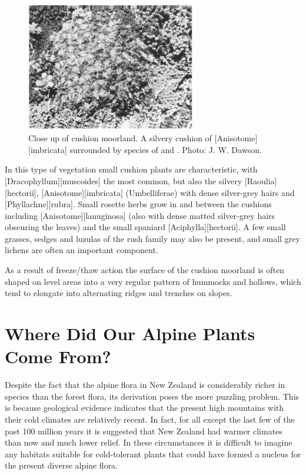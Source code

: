 \begin{figure}
	\includegraphics[width=0.66\textwidth]{graphics/figure114cushion-moorland.jpg}
	\centering
	\caption[Close up of cushion moorland]{Close up of cushion moorland.
A silvery cushion of [Anisotome][imbricata] surrounded by species of  and .
	Photo: J. W. Dawson.}%
	\label{fig:114cushion-moorland}
\end{figure}

In this type of vegetation small cushion plants are characteristic, with [Dracophyllum][muscoides] the most common, but also the silvery [Raoulia][hectorii], [Anisotome][imbricata] (Umbelliferae) with dense silver-grey hairs and [Phyllachne][rubra].
Small rosette herbs grow in and between the cushions including [Anisotome][lanuginosa] (also with dense matted silver-grey hairs obscuring the leaves) and the small spaniard [Aciphylla][hectorii].
A few small grasses, sedges and luzulas of the rush family may also be present, and small grey lichens are often an important component.

As a result of freeze/thaw action the surface of the cushion moorland is often shaped on level areas into a very regular pattern of hummocks and hollows, which tend to elongate into alternating ridges and trenches on slopes.

\chapter{Where Did Our Alpine Plants Come From?}

Despite the fact that the alpine flora in New Zealand is considerably richer in species than the forest flora, its derivation poses the more puzzling problem.
This is because geological evidence indicates that the present high mountains with their cold climates are relatively recent.
In fact, for all except the last few of the past 100 million years it is suggested that New Zealand had warmer climates than now and much lower relief.
In these circumstances it is difficult to imagine any habitats suitable for cold-tolerant plants that could have formed a nucleus for the present diverse alpine flora.

